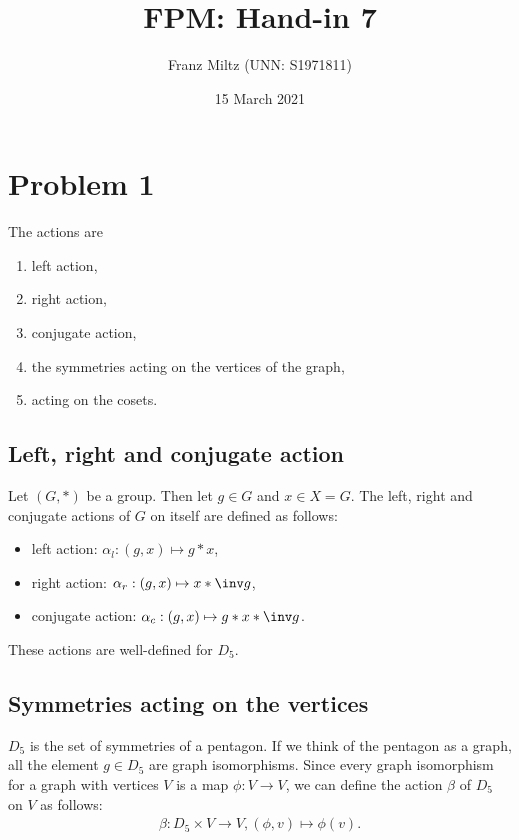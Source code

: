\documentclass{article}
\begin{document}
\title{FPM: Hand-in 7}
\author{Franz Miltz (UNN: S1971811)}
\date{15 March 2021}
\maketitle
\mkthms
\section*{Problem 1}

The actions are
\begin{enumerate}
    \item left action,
    \item right action,
    \item conjugate action,
    \item the symmetries acting on the vertices of the graph,
    \item acting on the cosets.
\end{enumerate}

\subsection*{Left, right and conjugate action}

Let $(G, *)$ be a group. Then let $g\in G$ and $x\in X = G$.
The left, right and conjugate actions of $G$ on itself are defined as follows:

\begin{itemize}
    \item left action: $\alpha_l: (g,x) \mapsto g * x$,
    \item right action: $\alpha_r: (g,x) \mapsto x * \inv g$,
    \item conjugate action: $\alpha_c: (g,x) \mapsto g * x * \inv g$.
\end{itemize}

\noindent These actions are well-defined for $D_5$.

\subsection*{Symmetries acting on the vertices}

$D_5$ is the set of symmetries of a pentagon. If we think of the pentagon as
a graph, all the element $g\in D_5$ are graph isomorphisms. Since every
graph isomorphism for a graph with vertices $V$ is a map $\phi:V\to V$,
we can define the action $\beta$ of $D_5$ on $V$ as follows:
\begin{align*}
    \beta: D_5\times V\to V,(\phi, v)\mapsto \phi(v).
\end{align*}
\end{document}
